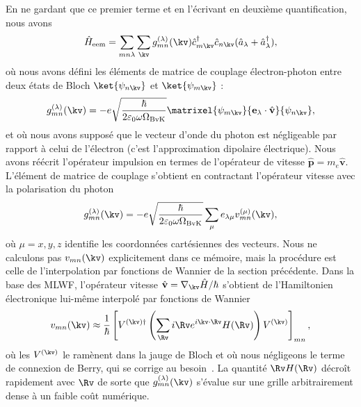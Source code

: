 En ne gardant que ce premier terme et en l'écrivant en deuxième quantification, nous avons
\begin{equation}
    \hat{H}_\text{eem}=\sum_{mn\lambda}\sum_\kv g_{mn}^{(\lambda)}(\kv)\hat{c}^\dag_{m\kv}\hat{c}_{n\kv}(\hat{a}_\lambda+\hat{a}^\dag_\lambda),\label{eqn:H_eem}
\end{equation}
où nous avons défini les éléments de matrice de couplage électron-photon entre deux états de Bloch $\ket{\psi_{n\kv}}$ et $\ket{\psi_{m\kv}}$ : 
\begin{equation}
    g^{(\lambda)}_{mn}(\kv) = -e\sqrt{\frac{\hbar}{2\varepsilon_0 \omega \Omega_\text{BvK}}}\matrixel{\psi_{m\kv}}{\mathbf{e}_\lambda\cdot\hat{\mathbf{v}}}{\psi_{n\kv}},
\end{equation}
et où nous avons supposé que le vecteur d'onde du photon est négligeable par rapport à celui de l'électron (c'est l'approximation dipolaire électrique). Nous avons réécrit l'opérateur impulsion en termes de l'opérateur de vitesse $\hat{\mathbf{p}}=m_e\hat{\mathbf{v}}$. L'élément de matrice de couplage s'obtient en contractant l'opérateur vitesse avec la polarisation du photon
\begin{equation}
    g^{(\lambda)}_{mn}(\kv) = -e\sqrt{\frac{\hbar}{2\varepsilon_0\omega \Omega_\text{BvK}}}\sum_\mu e_{\lambda\mu}v_{mn}^{(\mu)}(\kv),
\end{equation}
où $\mu=x,y,z$ identifie les coordonnées cartésiennes des vecteurs. Nous ne calculons pas $v_{mn}(\kv)$ explicitement dans ce mémoire, mais la procédure est celle de l'interpolation par fonctions de Wannier de la section précédente. Dans la base des MLWF, l'opérateur vitesse $\hat{\mathbf{v}}=\nabla_\kv\hat{H}/\hbar$ s'obtient de l'Hamiltonien électronique lui-même interpolé par fonctions de Wannier
\begin{equation}
    v_{mn}(\kv)\approx\frac{1}{\hbar}\left[V^{(\kv)\dag}\left(\sum_\Rv i\Rv e^{i\kv\cdot\Rv}H(\Rv)\right)V^{(\kv)}\right]_{mn},
\end{equation}
où les $V^{(\kv)}$ le ramènent dans la jauge de Bloch et où nous négligeons le terme de connexion de Berry, qui se corrige au besoin~\cite{yatesSpectralFermiSurface2007}. La quantité $\Rv H(\Rv)$ décroît rapidement avec $\Rv$ de sorte que $g_{mn}^{(\lambda)}(\kv)$ s'évalue sur une grille arbitrairement dense à un faible coût numérique.

